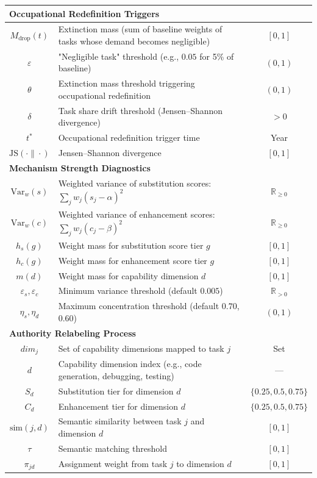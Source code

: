 \begin{longtable}{clc}
\multicolumn{3}{l}{\textbf{Occupational Redefinition Triggers}} \\
\midrule
$M_{\text{drop}}(t)$ & Extinction mass (sum of baseline weights of tasks whose demand becomes negligible) & $[0,1]$ \\
$\varepsilon$ & "Negligible task" threshold (e.g., $0.05$ for 5\% of baseline) & $(0,1)$ \\
$\theta$ & Extinction mass threshold triggering occupational redefinition & $(0,1)$ \\
$\delta$ & Task share drift threshold (Jensen--Shannon divergence) & $>0$ \\
$t^*$ & Occupational redefinition trigger time & Year \\
$\mathrm{JS}(\cdot\|\cdot)$ & Jensen--Shannon divergence & $[0,1]$ \\
\midrule

\multicolumn{3}{l}{\textbf{Mechanism Strength Diagnostics}} \\
\midrule
$\mathrm{Var}_w(s)$ & Weighted variance of substitution scores: $\sum_j w_j(s_j-\alpha)^2$ & $\mathbb{R}_{\ge 0}$ \\
$\mathrm{Var}_w(c)$ & Weighted variance of enhancement scores: $\sum_j w_j(c_j-\beta)^2$ & $\mathbb{R}_{\ge 0}$ \\
$h_s(g)$ & Weight mass for substitution score tier $g$ & $[0,1]$ \\
$h_c(g)$ & Weight mass for enhancement score tier $g$ & $[0,1]$ \\
$m(d)$ & Weight mass for capability dimension $d$ & $[0,1]$ \\
$\varepsilon_s,\varepsilon_c$ & Minimum variance threshold (default $0.005$) & $\mathbb{R}_{>0}$ \\
$\eta_s,\eta_d$ & Maximum concentration threshold (default $0.70$, $0.60$) & $(0,1)$ \\
\midrule

\multicolumn{3}{l}{\textbf{Authority Relabeling Process}} \\
\midrule
$\textit{dim}_j$ & Set of capability dimensions mapped to task $j$ & Set \\
$d$ & Capability dimension index (e.g., code generation, debugging, testing) & --- \\
$S_d$ & Substitution tier for dimension $d$ & $\{0.25,0.5,0.75\}$ \\
$C_d$ & Enhancement tier for dimension $d$ & $\{0.25,0.5,0.75\}$ \\
$\mathrm{sim}(j,d)$ & Semantic similarity between task $j$ and dimension $d$ & $[0,1]$ \\
$\tau$ & Semantic matching threshold & $[0,1]$ \\
$\pi_{jd}$ & Assignment weight from task $j$ to dimension $d$ & $[0,1]$ \\
\midrule


\end{longtable}
